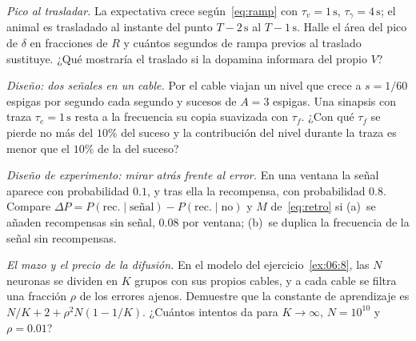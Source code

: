 \begin{exercise}[\lvlB]
\label{ex:07:5}
\emph{Pico al trasladar.} La expectativa crece según~\eqref{eq:ramp} con $\tau_v=1\,\text{s}$, $\tau_\gamma=4\,\text{s}$; el animal es trasladado al instante del punto $T-2\,\text{s}$ al $T-1\,\text{s}$. Halle el área del pico de $\delta$ en fracciones de $R$ y cuántos segundos de rampa previos al traslado sustituye. ¿Qué mostraría el traslado si la dopamina informara del propio $V$?
\end{exercise}

\begin{exercise}[\lvlB]
\label{ex:07:6}
\emph{Diseño: dos señales en un cable.} Por el cable  viajan un nivel que crece a $s=1/60$ espigas por segundo cada segundo y sucesos de $A=3$ espigas. Una sinapsis con traza $\tau_e=1\,\text{s}$ resta a la frecuencia su copia suavizada con $\tau_f$. ¿Con qué $\tau_f$ se pierde no más del $10\%$ del suceso y la contribución del nivel durante la traza es menor que el $10\%$ de la del suceso?
\end{exercise}

\begin{exercise}[\lvlB]
\label{ex:07:7}
\emph{Diseño de experimento: mirar atrás frente al error.} En una ventana la señal aparece con probabilidad $0.1$, y tras ella la recompensa, con probabilidad $0.8$. Compare $\Delta P=P(\text{rec.}\mid\text{señal})-P(\text{rec.}\mid\text{no})$ y $M$ de~\eqref{eq:retro} si (a)~se añaden recompensas sin señal, $0.08$ por ventana; (b)~se duplica la frecuencia de la señal sin recompensas.
\end{exercise}

\begin{exercise}[\lvlC]
\label{ex:07:8}
\emph{El mazo y el precio de la difusión.} En el modelo del ejercicio~\ref{ex:06:8}, las $N$ neuronas se dividen en $K$ grupos con sus propios cables, y a cada cable se filtra una fracción $\rho$ de los errores ajenos. Demuestre que la constante de aprendizaje es $N/K+2+\rho^2N(1-1/K)$. ¿Cuántos intentos da para $K\to\infty$, $N=10^{10}$ y $\rho=0.01$?
\end{exercise}

